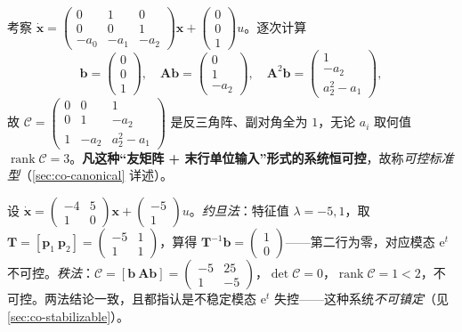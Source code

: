 \begin{example}[可控标准型必可控]\label{ex:co-cstd}
考察 $\dot{\mathbf{x}}=\begin{pmatrix}0&1&0\\0&0&1\\-a_0&-a_1&-a_2\end{pmatrix}\mathbf{x}+\begin{pmatrix}0\\0\\1\end{pmatrix}u$。逐次计算
\[
  \mathbf{b}=\begin{pmatrix}0\\0\\1\end{pmatrix},\quad
  \mathbf{A}\mathbf{b}=\begin{pmatrix}0\\1\\-a_2\end{pmatrix},\quad
  \mathbf{A}^2\mathbf{b}=\begin{pmatrix}1\\-a_2\\a_2^2-a_1\end{pmatrix},
\]
故 $\mathcal{C}=\begin{pmatrix}0&0&1\\0&1&-a_2\\1&-a_2&a_2^2-a_1\end{pmatrix}$ 是反三角阵、副对角全为 $1$，无论 $a_i$ 取何值 $\operatorname{rank}\mathcal{C}=3$。\textbf{凡这种“友矩阵 + 末行单位输入”形式的系统恒可控}，故称\emph{可控标准型}（\cref{sec:co-canonical} 详述）\cite{liubao2006modern}。
\end{example}

\begin{example}\label{ex:co-uncontrol}
设 $\dot{\mathbf{x}}=\begin{pmatrix}-4&5\\1&0\end{pmatrix}\mathbf{x}+\begin{pmatrix}-5\\1\end{pmatrix}u$。\emph{约旦法}：特征值 $\lambda=-5,1$，取 $\mathbf{T}=[\mathbf{p}_1\ \mathbf{p}_2]=\begin{pmatrix}-5&1\\1&1\end{pmatrix}$，算得 $\mathbf{T}^{-1}\mathbf{b}=\begin{pmatrix}1\\0\end{pmatrix}$——第二行为零，对应模态 $\mathrm{e}^{t}$ 不可控。\emph{秩法}：$\mathcal{C}=[\mathbf{b}\ \mathbf{A}\mathbf{b}]=\begin{pmatrix}-5&25\\1&-5\end{pmatrix}$，$\det\mathcal{C}=0$，$\operatorname{rank}\mathcal{C}=1<2$，不可控。两法结论一致，且都指认是不稳定模态 $\mathrm{e}^{t}$ 失控——这种系统\emph{不可镇定}（见 \cref{sec:co-stabilizable}）\cite{liubao2006modern}。
\end{example}

